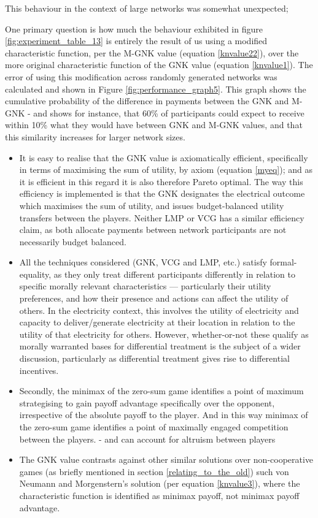 \documentclass[
10pt, %
a4paper, %
oneside, %
headinclude,footinclude, %
BCOR5mm, %
]{scrartcl}
\begin{document}
This behaviour in the context of large networks was somewhat unexpected;

One primary question is how much the behaviour exhibited in figure \ref{fig:experiment_table_13} is entirely the result of us using a modified characteristic function, per the M-GNK value (equation \ref{knvalue22}), over the more original characteristic function of the GNK value (equation \ref{knvalue1}).
The error of using this modification across randomly generated networks was calculated and shown in Figure \ref{fig:performance_graph5}.
This graph shows the cumulative probability of the difference in payments between the GNK and M-GNK - and shows for instance, that 60\% of participants could expect to receive within 10\% what they would have between GNK and M-GNK values, and that this similarity increases for larger network sizes.




\begin{itemize}
\item	It is easy to realise that the GNK value is axiomatically efficient, specifically in terms of maximising the sum of utility, by axiom (equation \ref{myeq}); and as it is efficient in this regard it is also therefore Pareto optimal.
The way this efficiency is implemented is that the GNK designates the electrical outcome which maximises the sum of utility, and issues budget-balanced utility transfers between the players.
Neither LMP or VCG has a similar efficiency claim, as both allocate payments between network participants are not necessarily budget balanced.
\item	All the techniques considered (GNK, VCG and LMP, etc.) satisfy formal-equality, as they only treat different participants differently in relation to specific morally relevant characteristics --- particularly their utility preferences, and how their presence and actions can affect the utility of others.
In the electricity context, this involves the utility of electricity and capacity to deliver/generate electricity at their location in relation to the utility of that electricity for others.
However, whether-or-not these qualify as morally warranted bases for differential treatment is the subject of a wider discussion, particularly as differential treatment gives rise to differential incentives.
\item	Secondly, the minimax of the zero-sum game identifies a point of maximum strategising to gain payoff advantage specifically over the opponent, irrespective of the absolute payoff to the player.
And in this way minimax of the zero-sum game identifies a point of maximally engaged competition between the players. - and can account for altruism between players
\item	The GNK value contrasts against other similar solutions over non-cooperative games (as briefly mentioned in section \ref{relating_to_the_old}) such von Neumann and Morgenstern's solution (per equation \ref{knvalue3}), where the characteristic function is identified as minimax payoff, not minimax payoff advantage.
\end{itemize}
\end{document}
